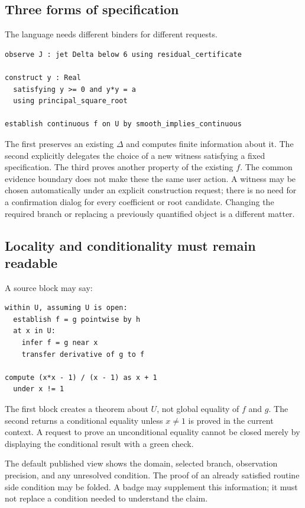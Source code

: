 \documentclass[11pt,letterpaper]{article}
\theoremstyle{remark}
\begin{document}
\subsection{Three forms of specification}
The language needs different binders for different requests.

\begin{lstlisting}[caption={Observation, construction, and refinement have different meanings.}]
observe J : jet Delta below 6 using residual_certificate

construct y : Real
  satisfying y >= 0 and y*y = a
  using principal_square_root

establish continuous f on U by smooth_implies_continuous
\end{lstlisting}

The first preserves an existing $\Delta$ and computes finite information about
it. The second explicitly delegates the choice of a new witness satisfying a
fixed specification. The third proves another property of the existing $f$.
The common evidence boundary does not make these the same user action.
A witness may be chosen automatically under an explicit construction request;
there is no need for a confirmation dialog for every coefficient or root
candidate. Changing the required branch or replacing a previously quantified
object is a different matter.

\subsection{Locality and conditionality must remain readable}
A source block may say:
\begin{lstlisting}[caption={Explicit local scope and a visible unresolved condition.}]
within U, assuming U is open:
  establish f = g pointwise by h
  at x in U:
    infer f = g near x
    transfer derivative of g to f

compute (x*x - 1) / (x - 1) as x + 1
  under x != 1
\end{lstlisting}

The first block creates a theorem about $U$, not global equality of $f$ and $g$.
The second returns a conditional equality unless $x\ne1$ is proved in the
current context. A request to prove an unconditional equality cannot be closed
merely by displaying the conditional result with a green check.

The default published view shows the domain, selected branch, observation
precision, and any unresolved condition. The proof of an already satisfied
routine side condition may be folded. A badge may supplement this information;
it must not replace a condition needed to understand the claim.
\end{document}
